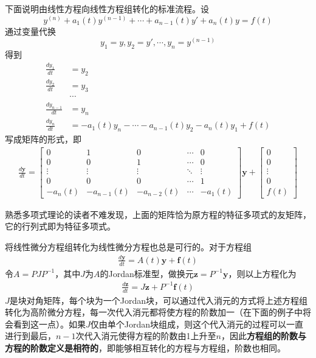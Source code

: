 下面说明由线性方程向线性方程组转化的标准流程。设
\[y^{(n)}+a_{1}(t)y^{(n-1)}+\cdots +a_{n-1}(t)y'+a_n(t)y=f(t)\]
通过变量代换
\[y_1=y,y_2=y',\cdots,y_n=y^{(n-1)}\]
得到\begin{align*}
        \frac{dy_1}{dt}&=y_2\\
        \frac{dy_2}{dt}&=y_3\\
        &\cdots\\
        \frac{dy_{n-1}}{dt}&=y_n\\
        \frac{dy_n}{dt}&=-a_{1}(t)y_{n}-\cdots -a_{n-1}(t)y_2-a_n(t)y_1+f(t)
\end{align*}
写成矩阵的形式，即\begin{align*}
    \frac{d\mathbf{y}}{dt}=\begin{bmatrix}
    0 & 1 & 0 & \cdots & 0\\
    0 & 0 & 1 & \cdots & 0\\
    \vdots & \vdots & \vdots & \ddots & \vdots\\
    0 & 0 & 0 & \cdots & 1\\
    -a_n(t) & -a_{n-1}(t) & -a_{n-2}(t) & \cdots & -a_1(t)
    \end{bmatrix}\mathbf{y}+\begin{bmatrix}
    0\\
    0\\
    \vdots\\
    0\\
    f(t)
    \end{bmatrix}
\end{align*}

熟悉多项式理论的读者不难发现，上面的矩阵恰为原方程的特征多项式的友矩阵，它的行列式即为特征多项式。

将线性微分方程组转化为线性微分方程也总是可行的。对于方程组\begin{align*}
    \frac{d\mathbf{y}}{dt}=A(t)\mathbf{y}+\mathbf{f}(t)
\end{align*}
令$A=PJP^{-1}$，其中$J$为$A$的Jordan标准型，做换元$\mathbf{z}=P^{-1}\mathbf{y}$，则以上方程化为\begin{align*}
    \frac{d\mathbf{z}}{dt}=J\mathbf{z}+P^{-1}\mathbf{f}(t)
\end{align*}
$J$是块对角矩阵，每个块为一个Jordan块，可以通过代入消元的方式将上述方程组转化为高阶微分方程，每一次代入消元都将使方程的阶数加一（在下面的例子中将会看到这一点）。如果$J$仅由单个Jordan块组成，则这个代入消元的过程可以一直进行到最后，$n-1$次代入消元使得方程的阶数由1上升至$n$，因此\textbf{方程组的阶数与方程的阶数定义是相符的}，即能够相互转化的方程与方程组，阶数也相同。

